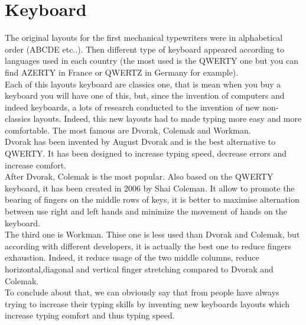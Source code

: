 \documentclass[12pt]{report}%
\begin{document}
\section{Keyboard}
The original layouts for the first mechanical typewriters were in alphabetical order (ABCDE etc..). Then different type of keyboard appeared according to languages used in each country (the most used is the QWERTY one but you can find AZERTY in France or QWERTZ in Germany for example).\\
Each of this layouts keyboard are classics one, that is mean when you buy a keyboard you will have one of this, but, since the invention of computers and indeed keyboards, a lots of research 	conducted to the invention of new non-classics layouts. Indeed, this new layouts had to made typing more easy and more comfortable. The most famous are Dvorak, Colemak and Workman.\\
Dvorak has been invented by August Dvorak and is the best alternative to QWERTY. It has been designed to increase typing speed, decrease errors and increase comfort.\\
After Dvorak, Colemak is the most popular. Also based on the QWERTY keyboard, it has been created in 2006 by Shai Coleman. It allow to promote the bearing of fingers on the middle rows of keys, it is better to maximise alternation between use right and left hands and minimize the movement of hands on the keyboard.\\
The third one is Workman. Thise one is less used than Dvorak and Colemak, but according with different developers, it is actually the best one to reduce fingers exhaustion. Indeed, it reduce usage of the two middle columns, reduce horizontal,diagonal and vertical finger stretching compared to Dvorak and Colemak.\cite{ref6}\\
To conclude about that, we can obviously say that from people have always trying to increase their typing skills by inventing new keyboards layouts which increase typing comfort and thus typing speed.     
\end{document}
